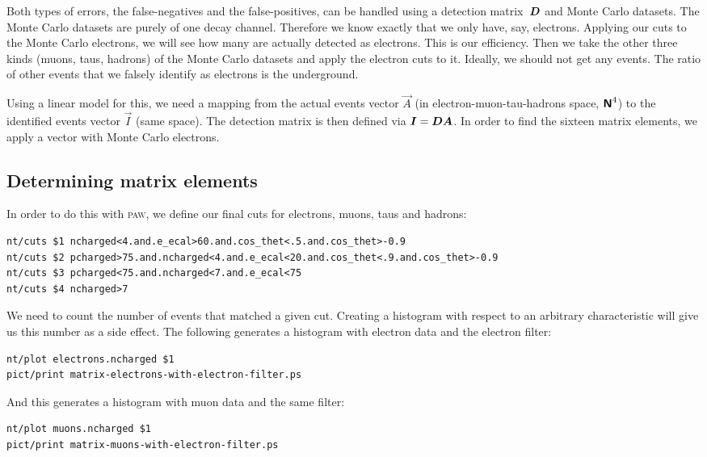 \documentclass[11pt, english, fleqn, DIV=15, headinclude, BCOR=2cm]{scrreprt}
\begin{document}
Both types of errors, the false-negatives and the false-positives, can be
handled using a detection matrix~$\mat D$ and Monte Carlo datasets.
The Monte Carlo datasets are purely of one decay channel. Therefore we know
exactly that we only have, say, electrons. Applying our cuts to the Monte Carlo
electrons, we will see how many are actually detected as electrons. This is our
efficiency. Then we take the other three kinds (muons, taus, hadrons) of the
Monte Carlo datasets and apply the electron cuts to it. Ideally, we should not
get any events. The ratio of other events that we falsely identify as electrons
is the underground.

Using a linear model for this, we need a mapping from the actual events vector
$\vec A$ (in electron-muon-tau-hadrons space, $\text{\bfseries\sffamily{N}}^4$) to the identified events
vector $\vec I$ (same space). The detection matrix is then defined via $\vec I
= \mat D \vec A$. In order to find the sixteen matrix elements, we apply a
vector with Monte Carlo electrons.

\subsection{Determining matrix elements}

In order to do this with \textsc{paw}, we define our final cuts for electrons,
muons, taus and hadrons:

\begin{lstlisting}
nt/cuts $1 ncharged<4.and.e_ecal>60.and.cos_thet<.5.and.cos_thet>-0.9
nt/cuts $2 pcharged>75.and.ncharged<4.and.e_ecal<20.and.cos_thet<.9.and.cos_thet>-0.9
nt/cuts $3 pcharged<75.and.ncharged<7.and.e_ecal<75
nt/cuts $4 ncharged>7
\end{lstlisting}

We need to count the number of events that matched a given cut. Creating a
histogram with respect to an arbitrary characteristic will give us this number
as a side effect. The following generates a histogram with electron data and
the electron filter:

\begin{lstlisting}
nt/plot electrons.ncharged $1
pict/print matrix-electrons-with-electron-filter.ps
\end{lstlisting}

And this generates a histogram with muon data and the same filter:

\begin{lstlisting}
nt/plot muons.ncharged $1
pict/print matrix-muons-with-electron-filter.ps
\end{lstlisting}
\end{document}
